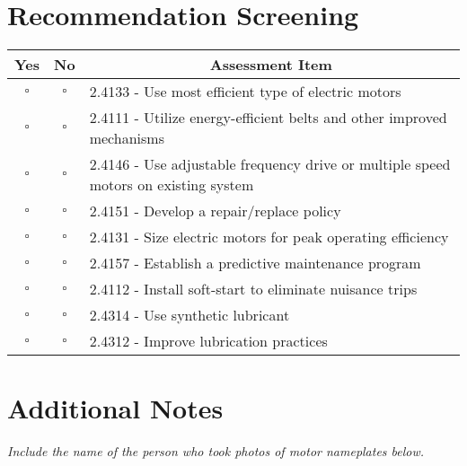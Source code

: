 \documentclass[./main.tex]{subfiles}
\begin{document}
\vspace{\answerspace}

\section*{Recommendation Screening}

\begin{tabular}{|c|c|p{13.5cm}|}
\hline
\multicolumn{1}{|c|}{\textbf{Yes}} & \multicolumn{1}{c|}{\textbf{No}} & \multicolumn{1}{c|}{\textbf{Assessment Item}} \\
\hline
$\square$ & $\square$ & 2.4133 - Use most efficient type of electric motors \\
\hline
$\square$ & $\square$ & 2.4111 - Utilize energy-efficient belts and other improved mechanisms \\
\hline
$\square$ & $\square$ & 2.4146 - Use adjustable frequency drive or multiple speed motors on existing system \\
\hline
$\square$ & $\square$ & 2.4151 - Develop a repair/replace policy \\
\hline
$\square$ & $\square$ & 2.4131 - Size electric motors for peak operating efficiency \\
\hline
$\square$ & $\square$ & 2.4157 - Establish a predictive maintenance program \\
\hline
$\square$ & $\square$ & 2.4112 - Install soft-start to eliminate nuisance trips \\
\hline
$\square$ & $\square$ & 2.4314 - Use synthetic lubricant \\
\hline
$\square$ & $\square$ & 2.4312 - Improve lubrication practices \\
\hline
\end{tabular}

\section*{Additional Notes}
\emph{Include the name of the person who took photos of motor nameplates below. }
\vspace{4cm}


\end{document}
